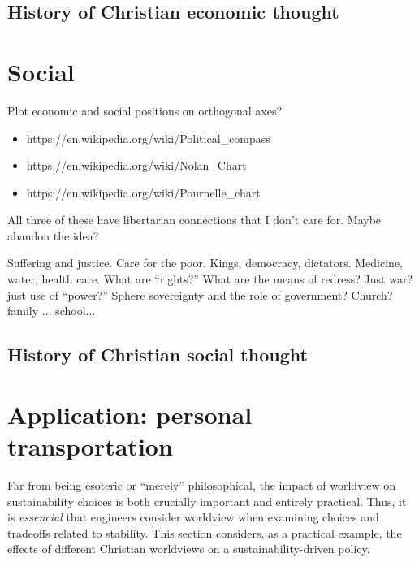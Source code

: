 \documentclass[12pt]{article}
\begin{document}
\subsection{History of Christian economic thought}
\label{sec:economic_history}



\section{Social}
\label{sec:social}

Plot economic and social positions on orthogonal axes?
\begin{itemize}
\item{https://en.wikipedia.org/wiki/Political\_compass}
\item{https://en.wikipedia.org/wiki/Nolan\_Chart}
\item{https://en.wikipedia.org/wiki/Pournelle\_chart}
\end{itemize}
All three of these have libertarian connections that I don't care for. Maybe abandon the idea?

Suffering and justice. Care for the poor. 
Kings, democracy, dictators.
Medicine, water, health care. What are ``rights?''
What are the means of redress?
Just war? just use of ``power?''
Sphere sovereignty and the role of government? Church? family ... school...


\subsection{History of Christian social thought}
\label{sec:social_history}


\section{Application: personal transportation}
\label{sec:personal_transportation}

Far from being esoteric or ``merely'' philosophical, the impact of worldview on sustainability choices is both crucially important and entirely practical. 
Thus, it is \emph{essencial} that engineers consider worldview when examining choices and tradeoffs related to stability.
This section considers, as a practical example, the effects of different Christian worldviews on a sustainability-driven policy.
\end{document}
